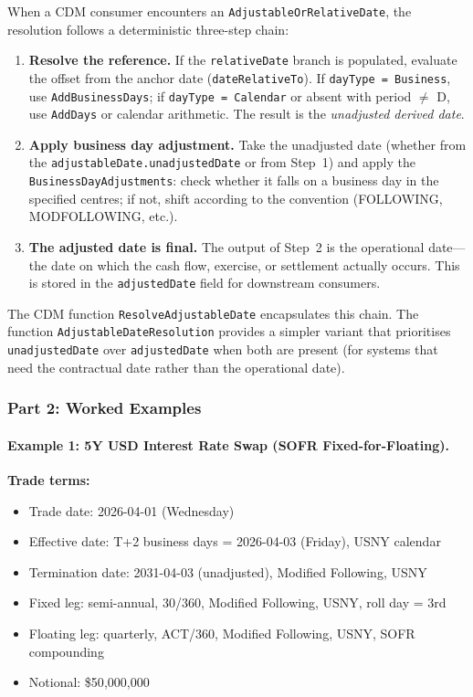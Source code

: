 \documentclass[11pt,a4paper]{article}
\begin{document}
When a CDM consumer encounters an \texttt{AdjustableOrRelativeDate}, the resolution follows a deterministic three-step chain:

\begin{enumerate}[nosep]
\item \textbf{Resolve the reference.} If the \texttt{relativeDate} branch is populated, evaluate the offset from the anchor date (\texttt{dateRelativeTo}). If \texttt{dayType = Business}, use \texttt{AddBusinessDays}; if \texttt{dayType = Calendar} or absent with period $\neq$ D, use \texttt{AddDays} or calendar arithmetic. The result is the \emph{unadjusted derived date}.

\item \textbf{Apply business day adjustment.} Take the unadjusted date (whether from the \texttt{adjustableDate.unadjustedDate} or from Step~1) and apply the \texttt{BusinessDayAdjustments}: check whether it falls on a business day in the specified centres; if not, shift according to the convention (FOLLOWING, MODFOLLOWING, etc.).

\item \textbf{The adjusted date is final.} The output of Step~2 is the operational date---the date on which the cash flow, exercise, or settlement actually occurs. This is stored in the \texttt{adjustedDate} field for downstream consumers.
\end{enumerate}

\noindent The CDM function \texttt{ResolveAdjustableDate} encapsulates this chain. The function \texttt{AdjustableDateResolution} provides a simpler variant that prioritises \texttt{unadjustedDate} over \texttt{adjustedDate} when both are present (for systems that need the contractual date rather than the operational date).

\subsubsection{Part 2: Worked Examples}
\label{sec:cdm-date-examples}

\paragraph{Example 1: 5Y USD Interest Rate Swap (SOFR Fixed-for-Floating).}

\smallskip
\noindent\textbf{Trade terms:}
\begin{itemize}[nosep]
\item Trade date: 2026-04-01 (Wednesday)
\item Effective date: T+2 business days = 2026-04-03 (Friday), USNY calendar
\item Termination date: 2031-04-03 (unadjusted), Modified Following, USNY
\item Fixed leg: semi-annual, 30/360, Modified Following, USNY, roll day = 3rd
\item Floating leg: quarterly, ACT/360, Modified Following, USNY, SOFR compounding
\item Notional: \$50{,}000{,}000
\end{itemize}
\end{document}
